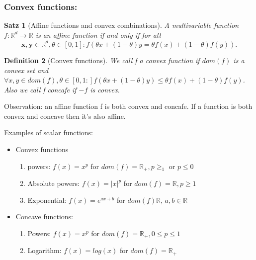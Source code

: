 \documentclass[11pt]{article}
\newtheorem{theorem}{Satz}
\newtheorem{definition}[theorem]{Definition}
\begin{document}
\subsubsection*{Convex functions: }
\begin{theorem}[Affine functions and convex combinations]
    A multivariable function $f:\mathbb{R}^d \to \mathbb{R}$ is an affine function if and only if for all \[
        \mathbf{x,y}\in \mathbb{R}^d, \theta \in [0,1]: f(\theta x + (1-\theta)y = \theta f(x) + (1-\theta)f(y))
    .\]    
    
\end{theorem}

\begin{definition}[Convex functions]
    We call f a convex function if $dom(f)$ is a convex set and $\forall x,y \in dom(f), \theta\in [0,1:] f(\theta x + (1-\theta) y) \leq \theta f(x) + (1-\theta)f(y)$. Also we call f concafe if $-f$ is convex.    
\end{definition}

Observation: an affine function f is both convex and concafe. If a function is both convex and concave then it's also affine.

Examples of scalar functions:
\begin{itemize}
    \item Convex functions \begin{enumerate}
        \item powers: $f(x) = x^p$ for $dom(f) = \mathbb{R}_+, p\geq_1$ or $p\leq0$   
        \item Absolute powers: $f(x) = |x|^p$ for $dom(f) = \mathbb{R}, p \geq 1$  
        \item Exponential: $f(x) = e^{ax+b}$ for $dom(f) \mathbb{R}$, $a,b\in\mathbb{R}$   
    \end{enumerate}
    \item Concave functions: \begin{enumerate}
        \item Powers: $f(x) = x^p$ for $dom(f) = \mathbb{R}_+, 0 \leq p \leq 1$
        \item Logarithm: $f(x) = log(x)$ for $dom(f) = \mathbb{R}_+$    
    \end{enumerate}

\end{itemize}
\end{document}
